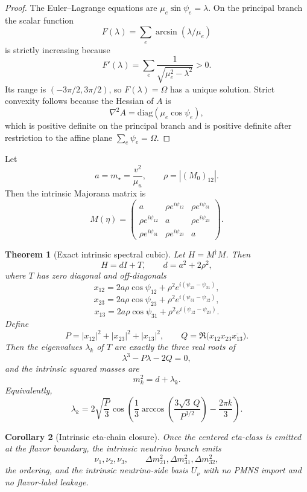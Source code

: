 \documentclass[11pt]{article}
\newtheorem{theorem}{Theorem}[section]
\newtheorem{corollary}[theorem]{Corollary}
\begin{document}
\begin{proof}
The Euler--Lagrange equations are \(\mu_e\sin\psi_e=\lambda\). On the principal branch the scalar
function
\[
F(\lambda)=\sum_e\arcsin(\lambda/\mu_e)
\]
is strictly increasing because
\[
F'(\lambda)=\sum_e\frac{1}{\sqrt{\mu_e^2-\lambda^2}}>0.
\]
Its range is \((-3\pi/2,3\pi/2)\), so \(F(\lambda)=\Omega\) has a unique solution. Strict
convexity follows because the Hessian of \(A\) is
\[
\nabla^2A=\mathrm{diag}(\mu_e\cos\psi_e),
\]
which is positive definite on the principal branch and is positive definite after
restriction to the affine plane \(\sum_e\psi_e=\Omega\).
\end{proof}

Let
\[
a=m_\star=\frac{v^2}{\mu_u},
\qquad
\rho = |(M_0)_{12}|.
\]
Then the intrinsic Majorana matrix is
\[
M(\eta)=
\begin{pmatrix}
a & \rho e^{i\psi_{12}} & \rho e^{i\psi_{31}}\\
\rho e^{i\psi_{12}} & a & \rho e^{i\psi_{23}}\\
\rho e^{i\psi_{31}} & \rho e^{i\psi_{23}} & a
\end{pmatrix}.
\]

\begin{theorem}[Exact intrinsic spectral cubic]
Let \(H=M^\dagger M\). Then
\[
H=dI+T,
\qquad
d=a^2+2\rho^2,
\]
where \(T\) has zero diagonal and off-diagonals
\[
x_{12}=2a\rho\cos\psi_{12}+\rho^2e^{i(\psi_{23}-\psi_{31})},
\]
\[
x_{23}=2a\rho\cos\psi_{23}+\rho^2e^{i(\psi_{31}-\psi_{12})},
\]
\[
x_{13}=2a\rho\cos\psi_{31}+\rho^2e^{i(\psi_{12}-\psi_{23})}.
\]
Define
\[
P=|x_{12}|^2+|x_{23}|^2+|x_{13}|^2,
\qquad
Q=\Re\!\bigl(x_{12}x_{23}\overline{x_{13}}\bigr).
\]
Then the eigenvalues \(\lambda_k\) of \(T\) are exactly the three real roots of
\[
\lambda^3-P\lambda-2Q=0,
\]
and the intrinsic squared masses are
\[
m_k^2=d+\lambda_k.
\]
Equivalently,
\[
\lambda_k=
2\sqrt{\frac{P}{3}}
\cos\!\left(
\frac13\arccos\!\left(\frac{3\sqrt3\,Q}{P^{3/2}}\right)-\frac{2\pi k}{3}
\right).
\]
\end{theorem}

\begin{corollary}[Intrinsic eta-chain closure]
Once the centered eta-class is emitted at the flavor boundary, the intrinsic neutrino branch
emits
\[
\nu_1,\nu_2,\nu_3,\qquad
\Delta m_{21}^2,\Delta m_{31}^2,\Delta m_{32}^2,
\]
the ordering, and the intrinsic neutrino-side basis \(U_\nu\) with no PMNS import and no
flavor-label leakage.
\end{corollary}
\end{document}
